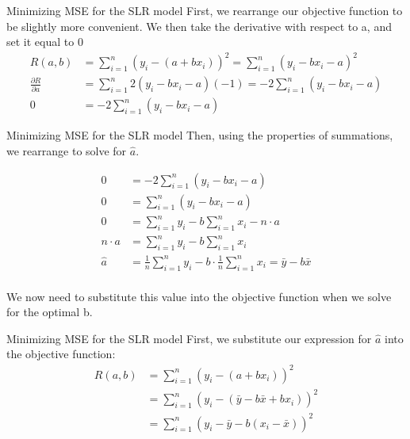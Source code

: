 \documentclass[aspectratio=169]{../latex_main/tntbeamer}  %
\begin{document}
	
	\begin{frame}{Minimizing MSE for the SLR model}
	            First, we rearrange our objective function to be slightly more convenient. We then take the derivative with respect to a, and set it equal to 0
	            \begin{align*}
	                R(a,b) &= \sum_{i=1}^n(y_i-(a+bx_i))^2 = \sum_{i=1}^n(y_i-bx_i-a)^2 \\
	                \frac{\partial R}{\partial a}&= \sum_{i=1}^n2(y_i-bx_i-a)(-1)=-2\sum_{i=1}^n(y_i-bx_i-a)\\
	                0&= -2\sum_{i=1}^n(y_i-bx_i-a)
	            \end{align*}
	\end{frame}
	
	
	
	\begin{frame}{Minimizing MSE for the SLR model}
	\vspace{-2em}
	           Then, using the properties of summations, we rearrange to solve for $\hat{a}$.
	           
	           \vspace{-1em}
	              \begin{align*}
	                0 &= -2\sum_{i=1}^n(y_i-bx_i-a)\\
	                0 &= \sum_{i=1}^n (y_i-bx_i-a)\\
	                0 &= \sum_{i=1}^n y_i- b\sum_{i=1}^n x_i - n \cdot a\\
	                n \cdot a &= \sum_{i=1}^ny_i- b\sum_{i=1}^nx_i\\
	                \hat{a} &=\frac{1}{n} \sum_{i=1}^n y_i- b\cdot\frac{1}{n}\sum_{i=1}^n x_i = \bar{y}- b\bar{x} \\
	              \end{align*}
	              
	        \vspace{-2em}
            We now need to substitute this value into the objective function when we solve for the optimal b.
	\end{frame}
	
	
	\begin{frame}{Minimizing MSE for the SLR model}
	           First, we substitute our expression for  $\hat{a}$   into the objective function:        
	           \begin{align*}
	                R(a,b) &= \sum_{i=1}^n(y_i-(a+bx_i))^2\\
	                       &=  \sum_{i=1}^n(y_i- (\bar{y}-b\bar{x}  +bx_i))^2\\
	                       &=  \sum_{i=1}^n(y_i- \bar{y}-b(x_i  -\bar{x}))^2\\
               \end{align*}
            	 
	\end{frame}
	
\end{document}
